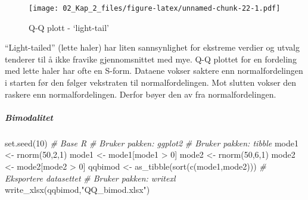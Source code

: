\documentclass[
]{article}
\newenvironment{Shaded}{\begin{snugshade}}{\end{snugshade}}
\newcommand{\CommentTok}[1]{\textcolor[rgb]{0.56,0.35,0.01}{\textit{#1}}}
\newcommand{\DecValTok}[1]{\textcolor[rgb]{0.00,0.00,0.81}{#1}}
\newcommand{\FunctionTok}[1]{\textcolor[rgb]{0.00,0.00,0.00}{#1}}
\newcommand{\NormalTok}[1]{#1}
\newcommand{\OtherTok}[1]{\textcolor[rgb]{0.56,0.35,0.01}{#1}}
\newcommand{\SpecialCharTok}[1]{\textcolor[rgb]{0.00,0.00,0.00}{#1}}
\newcommand{\StringTok}[1]{\textcolor[rgb]{0.31,0.60,0.02}{#1}}
\begin{document}
\begin{figure}
\centering
\texttt{[image: 02\_Kap\_2\_files/figure-latex/unnamed-chunk-22-1.pdf]}
\caption{\label{fig:unnamed-chunk-22}Q-Q plott - `light-tail'}
\end{figure}

``Light-tailed'' (lette haler) har liten sannsynlighet for ekstreme verdier og utvalg tenderer til å ikke fravike gjennomsnittet med mye. Q-Q plottet for en fordeling med lette haler har ofte en S-form. Dataene vokser saktere enn normalfordelingen i starten før den følger vekstraten til normalfordelingen. Mot slutten vokser den raskere enn normalfordelingen. Derfor bøyer den av fra normalfordelingen.

\hypertarget{bimodalitet}{%
\subparagraph{Bimodalitet}\label{bimodalitet}}

\begin{Shaded}
\begin{Highlighting}[]
\FunctionTok{set.seed}\NormalTok{(}\DecValTok{10}\NormalTok{) }
\CommentTok{\# Base R}
\CommentTok{\# Bruker pakken: ggplot2}
\CommentTok{\# Bruker pakken: tibble}
\NormalTok{mode1 }\OtherTok{\textless{}{-}} \FunctionTok{rnorm}\NormalTok{(}\DecValTok{50}\NormalTok{,}\DecValTok{2}\NormalTok{,}\DecValTok{1}\NormalTok{)}
\NormalTok{mode1 }\OtherTok{\textless{}{-}}\NormalTok{ mode1[mode1 }\SpecialCharTok{\textgreater{}} \DecValTok{0}\NormalTok{] }
\NormalTok{mode2 }\OtherTok{\textless{}{-}} \FunctionTok{rnorm}\NormalTok{(}\DecValTok{50}\NormalTok{,}\DecValTok{6}\NormalTok{,}\DecValTok{1}\NormalTok{)}
\NormalTok{mode2 }\OtherTok{\textless{}{-}}\NormalTok{ mode2[mode2 }\SpecialCharTok{\textgreater{}} \DecValTok{0}\NormalTok{] }
\NormalTok{qqbimod }\OtherTok{\textless{}{-}} \FunctionTok{as\_tibble}\NormalTok{(}\FunctionTok{sort}\NormalTok{(}\FunctionTok{c}\NormalTok{(mode1,mode2)))}
\CommentTok{\# Eksportere datasettet}
\CommentTok{\# Bruker pakken: writexl}
\FunctionTok{write\_xlsx}\NormalTok{(qqbimod,}\StringTok{"QQ\_bimod.xlsx"}\NormalTok{)}
\end{Highlighting}
\end{Shaded}
\end{document}
